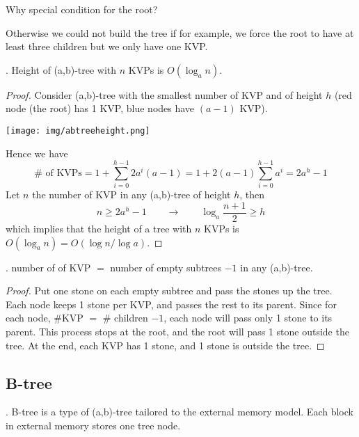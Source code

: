 \documentclass{article}
\begin{document}
\begin{Question}{}
    Why special condition for the root? 
\end{Question}

\begin{solution}
    Otherwise we could not build the tree if for example, we force the root to have at least three children but we only have one KVP. 
\end{solution}

\begin{thmm}[].
    Height of (a,b)-tree with $n$ KVPs is $O(\log_a n)$. 
\end{thmm}

\begin{proof}
    Consider (a,b)-tree with the smallest number of KVP and of height $h$ (red node (the root)  has 1 KVP, blue nodes have $(a-1)$ KVP). 
    \begin{center}
        \texttt{[image: img/abtreeheight.png]}
    \end{center}
    Hence we have 
    \[ \# \text{ of KVPs} = 1 + \sum_{i=0}^{h-1} 2a^i(a - 1)
    = 1 + 2(a - 1) \sum_{i=0}^{h-1} a^i 
    = 2a^h - 1 \]
    Let $n$ the number of KVP in any (a,b)-tree of height $h$, then 
    \[ n \geq 2 a^h - 1 \qquad \rightarrow \qquad \log_a \frac{n + 1}{2} \geq h \]
    which implies that the height of a tree with $n$ KVPs is $O(\log_a n) = O(\log n / \log a)$.
\end{proof}

\begin{thmm}[].
    number of of KVP $=$ number of empty subtrees $- 1$ in any (a,b)-tree. 
\end{thmm}

\begin{proof}
    Put one stone on each empty subtree and pass the stones up the tree. Each node keeps 1 stone per KVP, and passes the rest to its parent. Since for each node, \#KVP $=$ \# children $- 1$, each node will pass only 1 stone to its parent.  This process stops at the root, and the root will pass 1 stone outside the tree. At the end, each KVP has 1 stone, and 1 stone is outside the tree. 
\end{proof}

\subsection{B-tree} 

\begin{comm}[].
    B-tree is a type of (a,b)-tree tailored to the external memory model. Each block in external memory stores one tree node. 
\end{comm}
\end{document}
